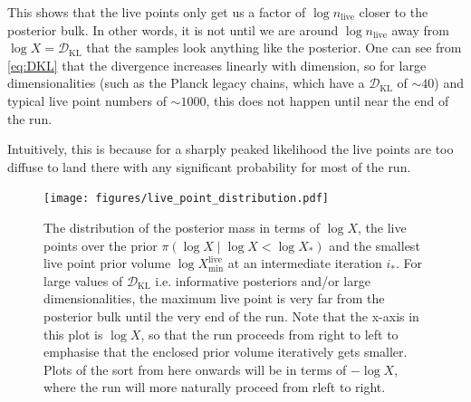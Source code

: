 \documentclass[usenatbib]{mnras}
\newcommand{\nlive}{n_\mathrm{live}}
\newcommand{\DKL}{\mathcal{D}_\mathrm{KL}}
\begin{document}
\par
This shows that the live points only get us a factor of $\log \nlive$ closer to the posterior bulk. In other words, it is not until we are around $\log \nlive$ away from $\log X = \DKL$ that the samples look anything like the posterior. One can see from \cref{eq:DKL} that the divergence increases linearly with dimension, so for large dimensionalities (such as the Planck legacy chains, which have a $\DKL$ of $\sim 40$) and typical live point numbers of  $\sim 1000$, this does not happen until near the end of the run.
\par
Intuitively, this is because for a sharply peaked likelihood the live points are too diffuse to land there with any significant probability for most of the run.
\begin{figure}
\begin{center}
	\texttt{[image: figures/live\_point\_distribution.pdf]}
\end{center}
\caption{The distribution of the posterior mass in terms of $\log X$, the live points over the prior $\pi(\log X \mid \log X < \log X_*)$ and the smallest live point prior volume $\log X_\mathrm{min}^{\mathrm{live}}$ at an intermediate iteration $i_*$. For large values of $\DKL$ i.e. informative posteriors and/or large dimensionalities, the maximum live point is very far from the posterior bulk until the very end of the run. Note that the x-axis in this plot is $\log X$, so that the run proceeds from right to left to emphasise that the enclosed prior volume iteratively gets smaller. Plots of the sort from here onwards will be in terms of $-\log X$, where the run will more naturally proceed from rleft to right. }
\label{fig:live_point_distribution}
\end{figure}
\end{document}
